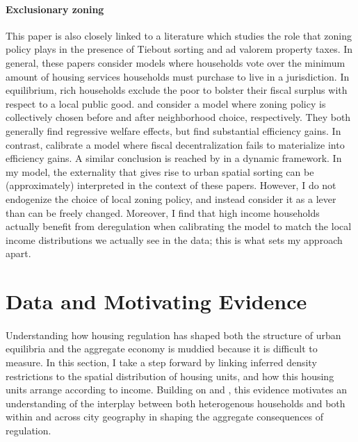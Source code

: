 \documentclass[]{article}
\begin{document}
\paragraph*{Exclusionary zoning}
This paper is also closely linked to a literature which studies the role that zoning policy plays in the presence of Tiebout sorting and ad valorem property taxes. In general, these papers consider models where households vote over the minimum amount of housing services households must purchase to live in a jurisdiction. In equilibrium, rich households exclude the poor to bolster their fiscal surplus with respect to a local public good. \cite{calabresetal} and \cite{keepingpeopleout} consider a model where zoning policy is collectively chosen before and after neighborhood choice, respectively. They both generally find regressive welfare effects, but find substantial efficiency gains. In contrast, \cite{ineffTiebout} calibrate a model where fiscal decentralization fails to materialize into efficiency gains. A similar conclusion is reached by \cite{barcoate} in a dynamic framework. In my model, the externality that gives rise to urban spatial sorting can be (approximately) interpreted in the context of these papers. However, I do not endogenize the choice of local zoning policy, and instead consider it as a lever than can be freely changed. Moreover, I find that high income households actually benefit from deregulation when calibrating the model to match the local income distributions we actually see in the data; this is what sets my approach apart. 

\section{Data and Motivating Evidence}\label{section:DataEvidence}
\paragraph*{}
Understanding how housing regulation has shaped both the structure of urban equilibria and the aggregate economy is muddied because it is difficult to measure. In this section, I take a step forward by linking inferred density restrictions to the spatial distribution of housing units, and how this housing units arrange according to income. Building on \cite{hseihmoretti} and \cite{durantonpugaurbgrowth}, this evidence motivates an understanding of the interplay between both heterogenous households and both within and across city geography in shaping the aggregate consequences of regulation.
\end{document}
